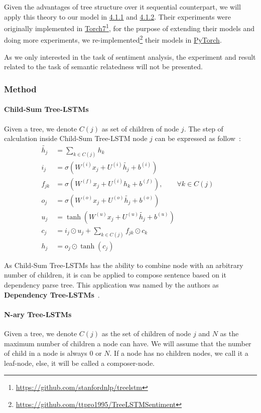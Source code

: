 Given the advantages of tree structure over it sequential counterpart, we will apply this theory to our model in \hyperref[sec:VTtree]{4.1.1} and \hyperref[sec:CNNtree]{4.1.2}. 
Their experiments were originally implemented in \hyperref[sec:torch]{Torch7}\footnote{\url{https://github.com/stanfordnlp/treelstm}}, for the purpose of extending their models and doing more experiments, we re-implemented\footnote{\url{https://github.com/ttpro1995/TreeLSTMSentiment}} their models in \hyperref[sec:pytorch]{PyTorch}. 

As we only interested in the task of sentiment analysis, the experiment and result related to the task of semantic relatedness will not be presented.

\subsubsection{Method}
\paragraph{Child-Sum Tree-LSTMs}
Given a tree, we denote \(C(j)\) as set of children of node \(j\).
The step of calculation inside Child-Sum Tree-LSTM node \(j\) can be expressed as follow~\cite{treeLSTM}:
\begin{align}
      \tilde{h_j} &= \sum_{k \in C(j)} h_k &\label{eq1:2}\\
      i_j &= \sigma{(W^{(i)}x_j + U^{(i)}\tilde{h_j} + b^{(i)})} &\label{eq1:3}\\
      f_{jk} &= \sigma{(W^{(f)}x_j + U^{(i)}h_k + b^{(f)})}, \qquad  \forall k \in C(j) & \label{eq1:foget1}\\
      o_j &= \sigma{(W^{(o)}x_j + U^{(o)}\tilde{h_j} + b^{(o)})} &\label{eq1:5}\\
      u_j &= \tanh{(W^{(u)}x_j + U^{(u)}\tilde{h_j} + b^{(u)})} &\label{eq1:6}\\
       c_j &= i_j \odot u_j + \sum_{k \in C(j)} f_{jk} \odot c_k & \\
    h_j &= o_j \odot \tanh{(c_j)} &
\end{align}

As Child-Sum Tree-LSTMs has the ability to combine node with an arbitrary number of children, it is can be applied to compose sentence based on it dependency parse tree.
This application was named by the authors as \textbf{Dependency Tree-LSTMs}~\cite{treeLSTM}.

\paragraph{N-ary Tree-LSTMs}
Given a tree, we denote \(C(j)\) as the set of children of node \(j\) and \(N\) as the maximum number of children a node can have. 
We will assume that the number of child in a node is always \(0\) or \(N\). 
If a node has no children nodes, we call it a leaf-node, else, it will be called a composer-node. 

